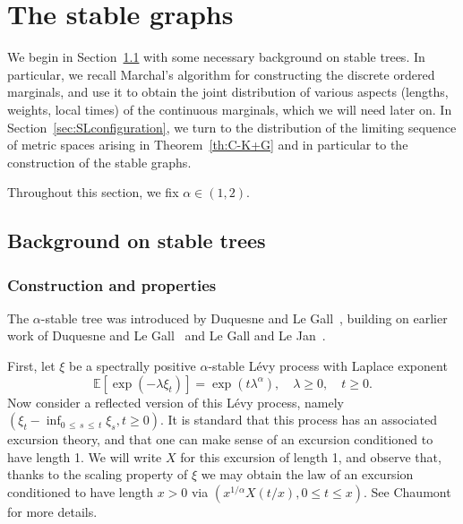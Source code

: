 \documentclass[AHL,Unicode,longabstracts,published]{cedram}
\newcommand{\E}[1]{\ensuremath{\mathbb{E} \left[#1 \right]}}
\begin{document}
\section{The stable graphs}\label{sec:SL}

We begin in Section~\ref{sec:stable} with some necessary background on stable trees. In particular, we recall Marchal's algorithm for constructing the discrete ordered marginals, and use it to obtain the joint distribution of various aspects (lengths, weights, local times) of the continuous marginals, which we will need later on. In Section~\ref{sec:SLconfiguration}, we turn to the distribution of the limiting sequence of metric spaces arising in Theorem~\ref{th:C-K+G} and in particular to the construction of the stable graphs.

Throughout this section, we fix $\alpha \in (1,2)$.

\subsection{Background on stable trees}\label{sec:stable}

\subsubsection{Construction and properties} \label{subsec:alphastable}

The $\alpha$-stable tree was introduced by Duquesne and Le Gall~\cite{DLG05}, building on earlier work of Duquesne and Le Gall~\cite{DuquesneLeGall} and Le Gall and Le Jan~\cite{LeGallLeJan}.

First, let $\xi$ be a spectrally positive $\alpha$-stable Lévy process with Laplace exponent
\[
\E{\exp\left(-\lambda \xi_t\right)} = \exp\left(t \lambda^{\alpha}\right), \quad \lambda \ge 0, \quad t \ge 0.
\]
Now consider a reflected version of this Lévy process, namely $(\xi_t - \inf_{0\,\le\,s\,\le\,t} \xi_s, t \ge 0)$. It is standard that this process has an associated excursion theory, and that one can make sense of an excursion conditioned to have length 1. We will write $X$ for this excursion of length 1, and observe that, thanks to the scaling property of $\xi$ we may obtain the law of an excursion conditioned to have length $x > 0$ via $(x^{1/\alpha} X(t/x), 0 \le t \le x)$. See Chaumont~\cite{Chaumont} for more details.
\end{document}
